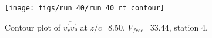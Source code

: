 \begin{figure}[H]
\centering
\texttt{[image: figs/run\_40/run\_40\_rt\_contour]}
\caption{Contour plot of $\overline{v_{r}^{\prime} v_{\theta}^{\prime}}$ at $z/c$=8.50, $V_{free}$=33.44, station 4.}
\label{fig:run_40_rt_contour}
\end{figure}


